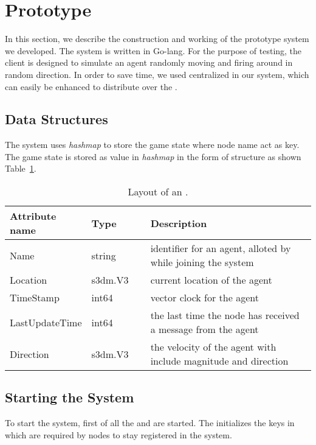\section{Prototype}
\label{sec:prototype}

	In this section, we describe the construction and working of the prototype system we developed. The system is written in Go-lang. For the purpose of testing, the client is designed to simulate an agent randomly moving and firing around in random direction.
	In order to save time, we used centralized \kvService in our system, which can easily be enhanced to distribute over the \localServer.
	
\subsection{Data Structures}
	The system uses \emph{hashmap} to store the game state where node name act as key. The game state is stored as value in \emph{hashmap} in the form of structure as shown Table~\ref{table:gamestate-struct}.


\begin{table}[htb]
	\centering
	\begin{tabular}{p{0.2\linewidth} | p{0.2\linewidth} | p{0.6\linewidth}}
		\textbf{Attribute name} & \textbf{Type} & \textbf{Description} \\ \hline
		Name & string & identifier for an agent, alloted by \activityServer while joining the system \\ \hline
		Location & s3dm.V3 & current location of the agent \\ \hline
		TimeStamp & int64  & vector clock for the agent \\  \hline
		LastUpdateTime & int64 & the last time the node has received a message from the agent\\ \hline
		Direction & s3dm.V3 & the velocity of the agent with include magnitude and direction \\ \hline	
	\end{tabular}
	\caption{\label{table:gamestate-struct} Layout of an \agentstate.}
\end{table}


\subsection{Starting the System}
	To start the system, first of all the \kvService and \activityServer are started. The \activityServer initializes the keys in \kvService which are required by nodes to stay registered in the system. 
	
